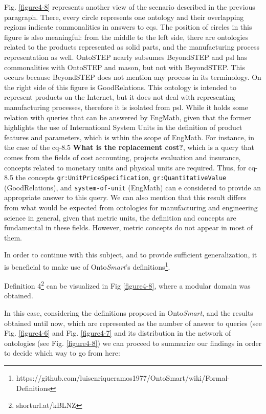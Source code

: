 Fig. \ref{figure4-8} represents another view of the scenario described in the previous paragraph. There, every circle represents one ontology and their overlapping regions indicate commonalities in answers to \gls{cq}s. The position of circles in this figure is also meaningful: from the middle to the left side, there are ontologies related to the products represented as solid   parts, and the manufacturing process representation as well. OntoSTEP nearly subsumes BeyondSTEP and \gls{psl} has commonalities with OntoSTEP and \gls{mason}, but not with BeyondSTEP. This occurs because BeyondSTEP does not mention any process in its terminology. On the right side of this figure is GoodRelations. This ontology is intended to represent products on the Internet, but it does not deal with representing manufacturing processes, therefore it is isolated from \gls{psl}. While it holds some relation with queries that can be answered by EngMath, given that the former highlights the use of International System  Units   in the definition of product features and parameters, which is wthin the scope of EngMath. For instance, in the case of the \gls{cq}-8.5 \textbf{What is the replacement cost?}, which is a query that comes from the fields of cost accounting, projects evaluation and insurance, concepts related to monetary units and physical units are required. Thus, for \gls{cq}-8.5 the concepts \texttt{gr:UnitPriceSpecification}, \texttt{gr:QuantitativeValue} (GoodRelations), and \texttt{system-of-unit} (EngMath) can e considered to provide an appropriate answer to this query. We can also mention that this result differs from what would be expected from ontologies for manufacturing and engineering science in general, given that metric units, the definition and concepts are fundamental in these fields. However, metric concepts do not appear in most of them.


In order to continue with this subject, and to provide sufficient generalization, it is beneficial to make use of Onto\textit{Smart}'s definitions\footnote{https://github.com/luisenriqueramos1977/OntoSmart/wiki/Formal-Definitions}.

Definition 4\footnote{shorturl.at/kBLNZ} can be visualized in Fig \ref{figure4-8}, where a modular domain was obtained. 

In this case, considering the definitions proposed in Onto\textit{Smart}, and the results obtained until now, which are represented as the number of answer to queries (see Fig. \ref{figure4-6} and Fig. \ref{figure4-7} and its distribution in the network of ontologies  (see Fig. \ref{figure4-8}) we can proceed to summarize our findings in order to decide which way to  go from here:

